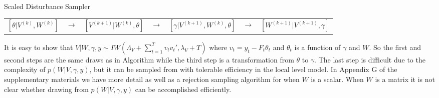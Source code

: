 \documentclass[12pt]{article}
\begin{document}
\begin{alg*}[SD]Scaled Disturbance Sampler\label{alg:DLMdist}
{\small \vspace{-.5cm}
\begin{center}
\begin{tabular}{lllllll}
$[\theta|V^{(k)},W^{(k)}]$ & $\to$ & $[V^{(k+1)}|W^{(k)},\theta]$ & $\to$ & $[\gamma|V^{(k+1)},W^{(k)},\theta]$ & $\to$ & $[W^{(k+1)}|V^{(k+1)},\gamma]$
\end{tabular}
\end{center}
}
\end{alg*}
\noindent
It is easy to show that $V|W,\gamma,y \sim IW\left(\Lambda_V + \sum_{t=1}^Tv_tv_t',\lambda_V + T\right)$ where $v_t = y_t - F_t\theta_t$ and $\theta_t$ is a function of $\gamma$ and $W$. So the first and second steps are the same draws as in Algorithm  while the third step is a transformation from $\theta$ to $\gamma$. The last step is difficult due to the complexity of $p(W|V,\gamma,y)$, but it can be sampled from with tolerable efficiency in the local level model. In Appendix G of the supplementary materials we have more detail as well as a rejection sampling algorithm for when $W$ is a scalar. When $W$ is a matrix it is not clear whether drawing from $p(W|V,\gamma,y)$ can be accomplished efficiently.
\end{document}
